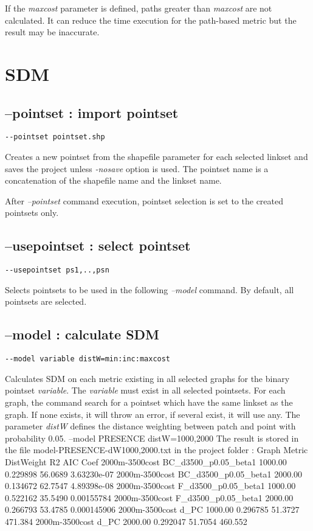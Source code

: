 \documentclass[a4paper,10pt]{report}
\newenvironment{cmd}
{\quote\Verbatim}
{\endVerbatim\endquote}
\begin{document}
If the \textit{maxcost} parameter is defined, paths greater than \textit{maxcost} are not calculated. It can reduce the time execution for the path-based metric but the result may be inaccurate.

\section{SDM}
\subsection{--pointset : import pointset}
\begin{verbatim}
--pointset pointset.shp
\end{verbatim}
Creates a new pointset from the shapefile parameter for each selected linkset and saves the project unless \textit{-nosave} option is used.
The pointset name is a concatenation of the shapefile name and the linkset name.

After \textit{--pointset} command execution, pointset selection is set to the created pointsets only.

\subsection{--usepointset : select pointset}
\begin{verbatim}
--usepointset ps1,..,psn
\end{verbatim}
Selects pointsets to be used in the following \textit{--model} command.
By default, all pointsets are selected.

\subsection{--model : calculate SDM}
\begin{verbatim}
--model variable distW=min:inc:maxcost
\end{verbatim}
Calculates SDM on each metric existing in all selected graphs for the binary pointset \textit{variable}.
The \textit{variable} must exist in all selected pointsets.
For each graph, the command search for a pointset which have the same linkset as the graph. If none exists, it will throw an error, if several exist, it will use any.
The parameter \textit{distW} defines the distance weighting between patch and point with probability 0.05.
\begin{cmd}
--model PRESENCE distW=1000,2000
\end{cmd}
The result is stored in the file model-PRESENCE-dW1000,2000.txt in the project folder :
\begin{cmd}[tabsize=3]
Graph           Metric                DistWeight R2        AIC       Coef
2000m-3500cost  BC_d3500_p0.05_beta1  1000.00	0.229898	56.0689	3.63230e-07
2000m-3500cost  BC_d3500_p0.05_beta1  2000.00	0.134672	62.7547	4.89398e-08
2000m-3500cost  F_d3500_p0.05_beta1   1000.00	0.522162	35.5490	0.00155784
2000m-3500cost  F_d3500_p0.05_beta1   2000.00	0.266793	53.4785	0.000145906
2000m-3500cost  d_PC                  1000.00	0.296785	51.3727	471.384
2000m-3500cost  d_PC                  2000.00	0.292047	51.7054	460.552
\end{cmd}
\end{document}
